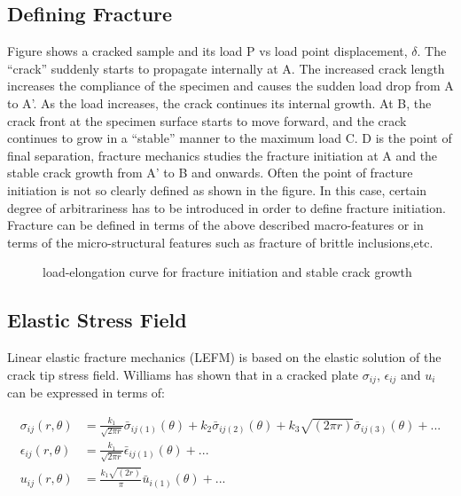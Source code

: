 \documentclass[12pt]{article}
\begin{document}
\subsection{Defining Fracture}Figure shows a cracked sample and its load P vs load point displacement, $\delta$. The “crack” suddenly starts to propagate internally at A. The increased crack length increases the compliance of the specimen and causes the sudden load drop from A to A'. As the load increases, the crack continues its internal growth. At B, the crack front at the specimen surface starts to move forward, and the crack continues to grow in a “stable” manner to the maximum load C. D is the point of final separation, fracture mechanics studies the fracture initiation at A and the stable crack growth from A' to B and onwards. Often the point of fracture initiation is not so clearly defined as shown in the figure. In this case, certain degree of arbitrariness has to be introduced in order to define fracture initiation. Fracture can be defined in terms of the above described macro-features or in terms of the micro-structural features such as fracture of brittle inclusions,etc.
\begin{figure}[H]
    \centering
    \captionsetup{labelformat=empty}
    \caption{load-elongation curve for fracture initiation and stable crack growth}  
\end{figure}
\subsection{Elastic Stress Field}Linear elastic fracture mechanics (LEFM) is based on the elastic solution of the crack tip stress field. Williams has shown that in a cracked plate 
$\sigma_{ij}$, $\epsilon_{ij}$ and $u_i$ can be expressed in terms of:

\begin{align*}
    \sigma_{ij}(r, \theta) &= \frac{k_1}{\sqrt{2 \pi r}} \bar{\sigma}_{ij(1)}(\theta) + k_2 \bar{\sigma}_{ij(2)}(\theta) + k_3 \sqrt{(2 \pi r)}\bar{\sigma}_{ij(3)}(\theta) + ...
    \\\epsilon_{ij}(r, \theta) &= \frac{k_1}{\sqrt{2 \pi r}} \bar{\epsilon}_{ij(1)}(\theta) + ... \tag{1} \label{1}
    \\u_{ij}(r, \theta) &= \frac{k_1 \sqrt{(2 r)}}{\pi} \bar{u}_{i(1)}(\theta) + ...
\end{align*}
\end{document}
